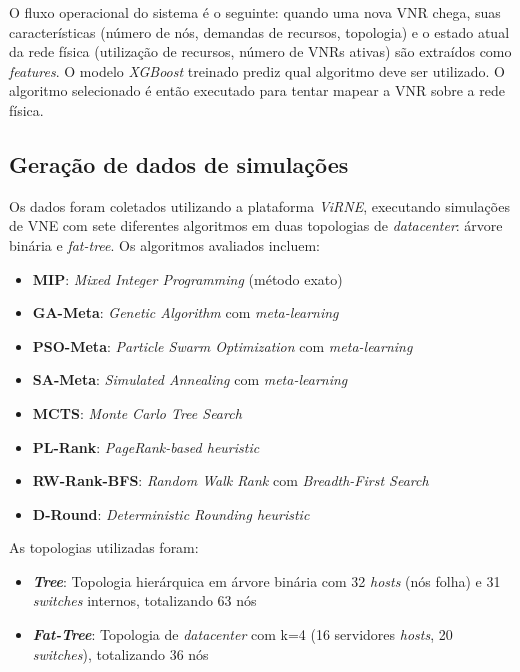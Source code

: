 \documentclass[conference]{IEEEtran}
\begin{document}
O fluxo operacional do sistema é o seguinte: quando uma nova VNR chega, suas características (número de nós, demandas de recursos, topologia) e o estado atual da rede física (utilização de recursos, número de VNRs ativas) são extraídos como \textit{features}.
O modelo \textit{XGBoost} treinado prediz qual algoritmo deve ser utilizado. O algoritmo selecionado é então executado para tentar mapear a VNR sobre a rede física.

\subsection{Geração de dados de simulações}

Os dados foram coletados utilizando a plataforma \textit{ViRNE}, executando simulações de VNE com sete diferentes algoritmos em duas topologias de \textit{datacenter}: árvore binária e \textit{fat-tree}. Os algoritmos avaliados incluem:

\begin{itemize}
    \item \textbf{MIP}: \textit{Mixed Integer Programming} (método exato)
    \item \textbf{GA-Meta}: \textit{Genetic Algorithm} com \textit{meta-learning}
    \item \textbf{PSO-Meta}: \textit{Particle Swarm Optimization} com \textit{meta-learning}
    \item \textbf{SA-Meta}: \textit{Simulated Annealing} com \textit{meta-learning}
    \item \textbf{MCTS}: \textit{Monte Carlo Tree Search}
    \item \textbf{PL-Rank}: \textit{PageRank-based heuristic}
    \item \textbf{RW-Rank-BFS}: \textit{Random Walk Rank} com \textit{Breadth-First Search}
    \item \textbf{D-Round}: \textit{Deterministic Rounding heuristic}
\end{itemize}

As topologias utilizadas foram:

\begin{itemize}
    \item \textbf{\textit{Tree}}: Topologia hierárquica em árvore binária com 32 \textit{hosts} (nós folha) e 31 \textit{switches} internos, totalizando 63 nós
    \item \textbf{\textit{Fat-Tree}}: Topologia de \textit{datacenter} com k=4 (16 servidores \textit{hosts}, 20 \textit{switches}), totalizando 36 nós
\end{itemize}
\end{document}
